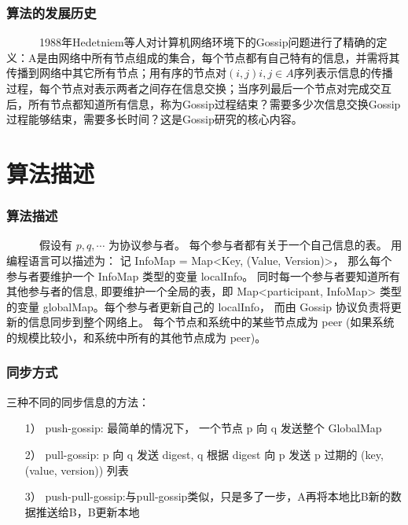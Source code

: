 \documentclass[slidestop,compress,mathserif,c]{beamer}
\begin{document}
\begin{frame}
\frametitle{算法的发展历史}
 
~~~~~~1988年Hedetniem等人对计算机网络环境下的Gossip问题进行了精确的定义：A是由网络中所有节点组成的集合，每个节点都有自己特有的信息，并需将其传播到网络中其它所有节点；用有序的节点对$(i,j)i,j\in A$序列表示信息的传播过程，每个节点对表示两者之间存在信息交换；当序列最后一个节点对完成交互后，所有节点都知道所有信息，称为Gossip过程结束？需要多少次信息交换Gossip过程能够结束，需要多长时间？这是Gossip研究的核心内容。
 
\end{frame}


\section{算法描述}

\begin{frame}
\frametitle{算法描述}
~~~~~~假设有 ${p, q, \cdots}$ 为协议参与者。 每个参与者都有关于一个自己信息的表。
用编程语言可以描述为： 
记 InfoMap = Map<Key, (Value, Version)>， 那么每个参与者要维护一个 InfoMap 类型的变量 localInfo。 同时每一个参与者要知道所有其他参与者的信息, 即要维护一个全局的表，即 Map<participant, InfoMap> 类型的变量 globalMap。每个参与者更新自己的 localInfo， 而由 Gossip 协议负责将更新的信息同步到整个网络上。
每个节点和系统中的某些节点成为 peer (如果系统的规模比较小，和系统中所有的其他节点成为 peer)。 
\end{frame}


\begin{frame}
\frametitle{同步方式}
 三种不同的同步信息的方法：
 \begin{itemize}
\item[1）]push-gossip: 最简单的情况下， 一个节点 p 向 q 发送整个 GlobalMap
\item[2）]pull-gossip: p 向 q 发送 digest, q 根据 digest 向 p 发送 p 过期的 (key, (value, version)) 列表
\item[3）]push-pull-gossip:与pull-gossip类似，只是多了一步，A再将本地比B新的数据推送给B，B更新本地 
 \end{itemize}
\end{frame}
\end{document}
